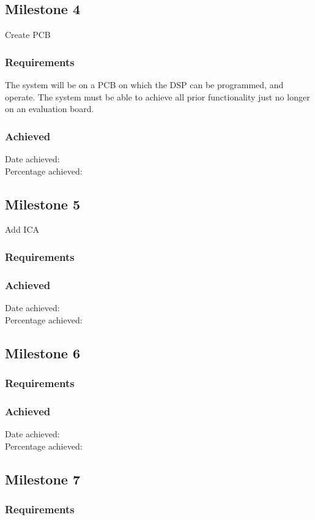 \documentclass[a4paper, 12pt]{memoir}
\begin{document}
\subsection{Milestone 4}
Create PCB
\subsubsection{Requirements}
The system will be on a PCB on which the DSP can be programmed, and operate.
The system must be able to achieve all prior functionality just no longer on an evaluation board.
\subsubsection{Achieved}
Date achieved:		\\
Percentage achieved:	\\

\subsection{Milestone 5}
Add ICA
\subsubsection{Requirements}

\subsubsection{Achieved}
Date achieved:		\\
Percentage achieved:	\\

\subsection{Milestone 6}
\subsubsection{Requirements}
\subsubsection{Achieved}
Date achieved:		\\
Percentage achieved:	\\

\subsection{Milestone 7}
\subsubsection{Requirements}
\end{document}
